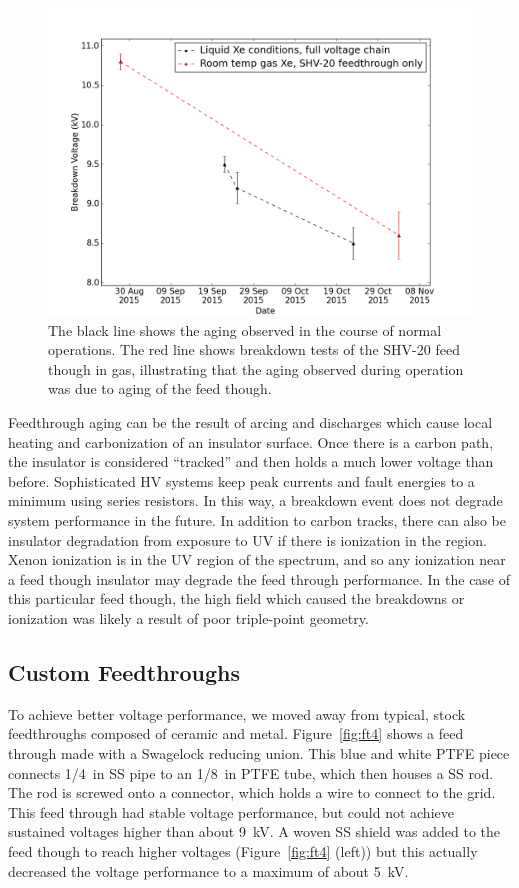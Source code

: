 \begin{figure}[htbp]
\begin{center}
\includegraphics[width=5in]{figures/testbed/shv20_breakdowns.png}
\caption{The black line shows the aging observed in the course of normal operations. The red line shows breakdown tests of the SHV-20 feed though in gas, illustrating that the aging observed during operation was due to aging of the feed though.}
\label{fig:aging}
\end{center}
\end{figure}

Feedthrough aging can be the result of arcing and discharges which cause local heating and carbonization of an insulator surface. Once there is a carbon path, the insulator is considered ``tracked'' and then holds a much lower voltage than before.  Sophisticated \ac{HV} systems keep peak currents and fault energies to a minimum using series resistors. In this way, a breakdown event does not degrade system performance in the future. In addition to carbon tracks, there can also be insulator degradation from exposure to UV if there is ionization in the region. Xenon ionization is in the UV region of the spectrum, and so any ionization near a feed though insulator may degrade the feed through performance. In the case of this particular feed though, the high field which caused the breakdowns or ionization was likely a result of poor triple-point geometry. 


\subsection{Custom Feedthroughs}
To achieve better voltage performance, we moved away from typical, stock feedthroughs composed of ceramic and metal. Figure~\ref{fig:ft4} shows a feed through made with a Swagelock reducing union. This blue and white \ac{PTFE} piece connects 1/4~in \ac{SS} pipe to an 1/8~in \ac{PTFE} tube, which then houses a \ac{SS} rod. The rod is screwed onto a connector, which holds a wire to connect to the grid. This feed through had stable voltage performance, but could not achieve sustained voltages higher than about 9~kV. A woven \ac{SS} shield was added to the feed though to reach higher voltages (Figure~\ref{fig:ft4} (left)) but this actually decreased the voltage performance to a maximum of about 5~kV.   

